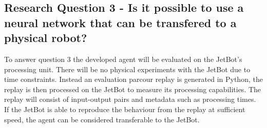 \subsection{Research Question 3 - Is it possible to use a neural network that can be transfered to a physical robot?}

To answer question 3 the developed agent will be evaluated on the JetBot's processing unit. There will be no physical experiments with the JetBot due to time constraints. Instead an evaluation parcour replay is generated in Python, the replay is then processed on the JetBot to measure its processing capabilities. The replay will consist of input-output pairs and metadata such as processing times. If the JetBot is able to reproduce the behaviour from the replay at sufficient speed, the agent can be considered transferable to the JetBot.

